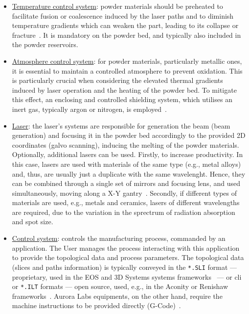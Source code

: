 \begin{itemize}
  \item \underline{Temperature control system}: powder materials should be
    preheated to facilitate fusion or coalescence induced by the laser
    paths and to diminish temperature gradients which can weaken the part,
    leading to its collapse or fracture~\cite{thompson2015overview}.
    It is mandatory on the powder bed, and typically also included in the
    powder reservoirs.
  \item \underline{Atmosphere control system}: for powder materials, particularly metallic ones, it is essential to maintain a
controlled atmosphere to prevent oxidation. This is particularly crucial when
considering the elevated thermal gradients induced by laser operation and the
heating of the powder bed. To mitigate this effect, an enclosing and controlled
shielding system, which utilises an inert gas, typically argon or nitrogen, is
employed~\cite{thompson2015overview}.
  \item \underline{Laser}: the laser's systems are responsible for generation the
    beam (beam generation) and focusing it in the powder bed accordingly to the
    provided 2D coordinates (galvo scanning), inducing the melting
    of the powder materials. Optionally, additional lasers can be used. Firstly,
    to increase productivity. In this case, lasers are used with materials of
    the same type (e.g., metal alloys) and, thus, are usually just a duplicate
    with the same wavelenght. Hence, they can be combined through a
    single set of mirrors and focusing lens, and used
    simultaneously, moving along a X-Y gantry~\cite{nadimpali2019MMSteels}. Secondly, if different types of materials are
    used, e.g., metals and ceramics, lasers of different wavelengths are
    required, due to the variation in the sprectrum of radiation absorption and
    spot size.
  \item \underline{Control system}: controls the manufacturing process,
    commanded by an application. The User manages the process interacting with
    this application to provide the topological data and process parameters. The
    topological data (slices and paths information) is typically conveyed in
    the \texttt{*.SLI} format --- proprietary, used in the EOS and 3D Systems
    systems frameworks~\cite{zeng2013layer} --- or \gls{cli} or \texttt{*.ILT} formats --- open source, used, e.g.,
    in the Aconity or Renishaw frameworks~\cite{aconityMachinesSite,
      renishawAM500}. Aurora Labs equipments, on the other hand, require the
    machine instructions to be provided directly (G-Code)~\cite{nadimpali2019MMSteels}.

\end{itemize}
